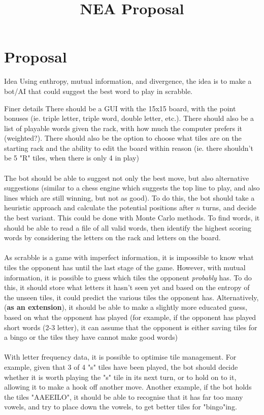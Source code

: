 \documentclass{article}
\title{NEA Proposal}
\begin{document}
\maketitle
\newpage

\section{Proposal}
\huge{Idea}
\newline
\normalsize{Using enthropy, mutual information, and divergence, the idea is to make a bot/AI that could suggest the best word to play in scrabble. \\}

\large{Finer details}
\newline
\normalsize{There should be a GUI with the 15x15 board, with the point bonuses (ie. triple letter, triple word, double letter, etc.). There should also be a list of playable words given the rack, with how much the computer prefers it (weighted?). There should also be the option to choose what tiles are on the starting rack and the ability to edit the board within reason (ie. there shouldn't be 5 "R" tiles, when there is only 4 in play)\\\\The bot should be able to suggest not only the best move, but also alternative suggestions (similar to a chess engine which suggests the top line to play, and also lines which are still winning, but not as good). To do this, the bot should take a heuristic approach and calculate the potential positions after $n$ turns, and decide the best variant. This could be done with Monte Carlo methods. To find words, it should be able to read a file of all valid words, then identify the highest scoring words by considering the letters on the rack and letters on the board.\\\\As scrabble is a game with imperfect information, it is impossible to know what tiles the opponent has until the last stage of the game. However, with mutual information, it is possible to guess which tiles the opponent \textit{probably} has. To do this, it should store what letters it hasn't seen yet and based on the entropy of the unseen tiles, it could predict the various tiles the opponent has. Alternatively, (\textbf{as an extension}), it should be able to make a slightly more educated guess, based on what the opponent has played (for example, if the opponent has played short words (2-3 letter), it can assume that the opponent is either saving tiles for a bingo or the tiles they have cannot make good words)\\\\With letter frequency data, it is possible to optimise tile management. For example, given that 3 of 4 "s" tiles have been played, the bot should decide whether it is worth playing the "s" tile in its next turn, or to hold on to it, allowing it to make a hook off another move. Another example, if the bot holds the tiles "AAEEILO", it should be able to recognise that it has far too many vowels, and try to place down the vowels, to get better tiles for "bingo"ing.} 
\end{document}
